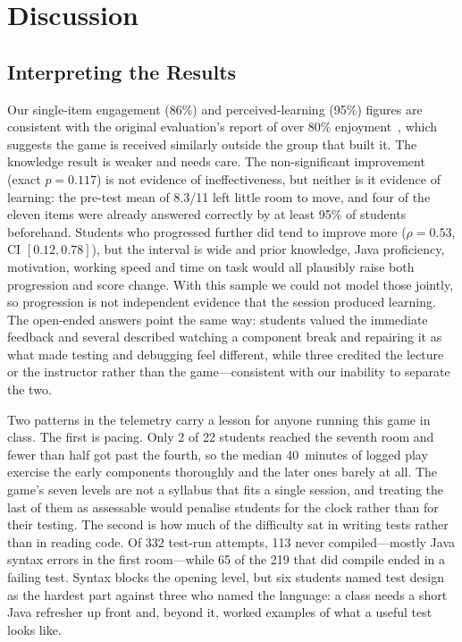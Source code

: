 \documentclass[conference]{IEEEtran}
\begin{document}
\section{Discussion}
\label{sec:discussion}

\subsection{Interpreting the Results}

Our single-item engagement (86\%) and perceived-learning (95\%) figures are consistent with the original evaluation's report of over 80\% enjoyment~\cite{straubinger2025sojourner}, which suggests the game is received similarly outside the group that built it.
The knowledge result is weaker and needs care. The non-significant improvement (exact $p = 0.117$) is not evidence of ineffectiveness, but neither is it evidence of learning: the pre-test mean of 8.3/11 left little room to move, and four of the eleven items were already answered correctly by at least 95\% of students beforehand.
Students who progressed further did tend to improve more ($\rho = 0.53$, CI $[0.12, 0.78]$), but the interval is wide and prior knowledge, Java proficiency, motivation, working speed and time on task would all plausibly raise both progression and score change. With this sample we could not model those jointly, so progression is not independent evidence that the session produced learning.
The open-ended answers point the same way: students valued the immediate feedback and several described watching a component break and repairing it as what made testing and debugging feel different, while three credited the lecture or the instructor rather than the game---consistent with our inability to separate the two.

Two patterns in the telemetry carry a lesson for anyone running this game in class. The first is pacing. Only 2 of 22 students reached the seventh room and fewer than half got past the fourth, so the median 40~minutes of logged play exercise the early components thoroughly and the later ones barely at all. The game's seven levels are not a syllabus that fits a single session, and treating the last of them as assessable would penalise students for the clock rather than for their testing.
The second is how much of the difficulty sat in writing tests rather than in reading code. Of 332 test-run attempts, 113 never compiled---mostly Java syntax errors in the first room---while 65 of the 219 that did compile ended in a failing test. Syntax blocks the opening level, but six students named test design as the hardest part against three who named the language: a class needs a short Java refresher up front and, beyond it, worked examples of what a useful test looks like.
\end{document}
